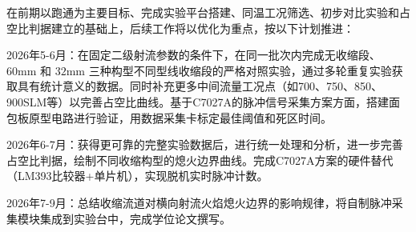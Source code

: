 在前期以跑通为主要目标、完成实验平台搭建、同温工况筛选、初步对比实验和占空比判据建立的基础上，后续工作将以优化为重点，按以下计划推进：

2026年5-6月：在固定二级射流参数的条件下，在同一批次内完成无收缩段、 \(60\mathrm{mm}\) 和 \(32\mathrm{mm}\) 三种构型不同型线收缩段的严格对照实验，通过多轮重复实验获取具有统计意义的数据。同时补充更多中间流量工况点（如700、750、850、900SLM等）以完善占空比曲线。基于C7027A的脉冲信号采集方案方面，搭建面包板原型电路进行验证，用数据采集卡标定最佳阈值和死区时间。

2026年6-7月：获得更可靠的完整实验数据后，进行统一处理和分析，进一步完善占空比判据，绘制不同收缩构型的熄火边界曲线。完成C7027A方案的硬件替代（LM393比较器+单片机），实现脱机实时脉冲计数。

2026年7-9月：总结收缩流道对横向射流火焰熄火边界的影响规律，将自制脉冲采集模块集成到实验台中，完成学位论文撰写。